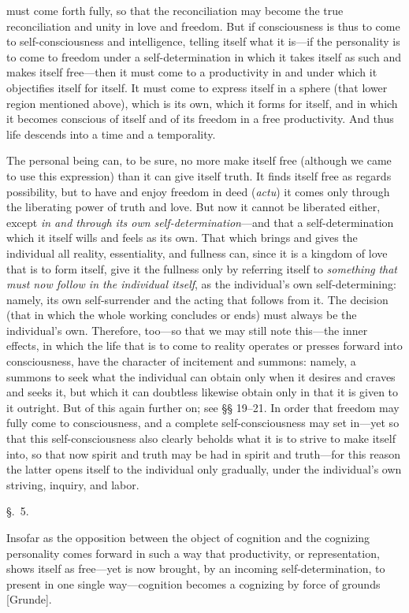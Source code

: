 \documentclass[12pt,a4paper]{book}
\begin{document}
must come forth fully, so that the reconciliation may become the true
reconciliation and unity in love and freedom. But if consciousness is thus to
come to self-consciousness and intelligence, telling itself what it is---if the
personality is to come to freedom under a self-determination in which it takes
itself as such and makes itself free---then it must come to a productivity in and
under which it objectifies itself for itself. It must come to express itself in a
sphere (that lower region mentioned above), which is its own, which it forms for
itself, and in which it becomes conscious of itself and of its freedom in a free
productivity. And thus life descends into a time and a temporality.

The personal being can, to be sure, no more make itself free (although we came to
use this expression) than it can give itself truth. It finds itself free as
regards possibility, but to have and enjoy freedom in deed (\textit{actu}) it
comes only through the liberating power of truth and love. But now it cannot be
liberated either, except \emph{in and through its own self-determination}---and
that a self-determination which it itself wills and feels as its own. That which
brings and gives the individual all reality, essentiality, and fullness can,
since it is a kingdom of love that is to form itself, give it the fullness only by
referring itself to \emph{something} \emph{that must now follow in the individual
itself}, as the individual's own self-determining: namely, its own self-surrender
and the acting that follows from it. The decision (that in which the whole working
concludes or ends) must always be the individual's own. Therefore, too---so that
we may still note this---the inner effects, in which the life that is to come to
reality operates or presses forward into consciousness, have the character of
incitement and summons: namely, a summons to seek what the individual can obtain
only when it desires and craves and seeks it, but which it can doubtless likewise
obtain only in that it is given to it outright. But of this again further on; see
§§ 19--21. In order that freedom may fully come to consciousness, and a complete
self-consciousness may set in---yet so that this self-consciousness also clearly
beholds what it is to strive to make itself into, so that now spirit and truth
may be had in spirit and truth---for this reason the latter opens itself to the
individual only gradually, under the individual's own striving, inquiry, and
labor.

\begin{center}\large\S.~5.\end{center}
Insofar as the opposition between the object of cognition and the cognizing
personality comes forward in such a way that productivity, or representation,
shows itself as free---yet is now brought, by an incoming self-determination, to
present in one single way---cognition becomes a cognizing by force of grounds
[Grunde].
\end{document}
